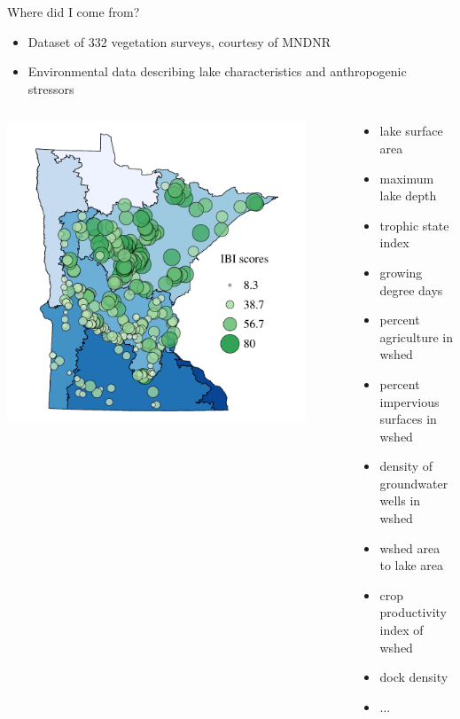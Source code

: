\documentclass[serif]{beamer}\usepackage[]{graphicx}\usepackage[]{color}
\begin{document}
\begin{frame}{Where did I come from?}{}
\begin{itemize}
\item Dataset of 332 vegetation surveys, courtesy of MNDNR \cite{Beck14a}
\item Environmental data describing lake characteristics and anthropogenic stressors
\end{itemize}
\begin{columns}
\begin{column}{0.5\textwidth}
\centerline{\includegraphics[width=0.9\textwidth]{fig/Beck_GEDsem-ibi_data.pdf}}
\end{column}
\begin{column}{0.5\textwidth}
\scriptsize
\begin{itemize}
\item{lake surface area}
\item{maximum lake depth}
\item{trophic state index}
\item{growing degree days}
\item{percent agriculture in wshed}
\item{percent impervious surfaces in wshed}
\item{density of groundwater wells in wshed}
\item{wshed area to lake area}
\item{crop productivity index of wshed}
\item{dock density}
\item{...}
\end{itemize}
\end{column}
\end{columns}
\end{frame}
\end{document}
